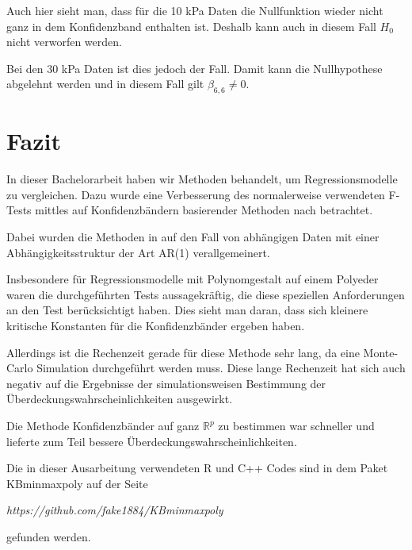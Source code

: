 \documentclass[12pt,a4paper]{article}
\theoremstyle{definition}
\theoremstyle{definition}
\theoremstyle{definition}
\theoremstyle{definition}
\begin{document}
Auch hier sieht man, dass für die 10 kPa Daten die Nullfunktion wieder nicht ganz in dem Konfidenzband enthalten ist. Deshalb kann auch in diesem Fall $H_0$ nicht verworfen werden.

Bei den 30 kPa Daten ist dies jedoch der Fall. Damit kann die Nullhypothese abgelehnt werden und in diesem Fall gilt $\beta_{6,6} \neq 0$.



\newpage
\section*{Fazit}
In dieser Bachelorarbeit haben wir Methoden behandelt, um Regressionsmodelle zu vergleichen. Dazu wurde eine Verbesserung des normalerweise verwendeten F-Tests mittles auf Konfidenzbändern basierender Methoden nach \cite{Liu64} betrachtet.

Dabei wurden die Methoden in \cite{Liu64} auf den Fall von abhängigen Daten mit einer Abhängigkeitsstruktur der Art AR(1) verallgemeinert.

Insbesondere für Regressionsmodelle mit Polynomgestalt auf einem Polyeder waren die durchgeführten Tests aussagekräftig, die diese speziellen Anforderungen an den Test berücksichtigt haben. Dies sieht man daran, dass sich kleinere kritische Konstanten für die Konfidenzbänder ergeben haben. 

Allerdings ist die Rechenzeit gerade für diese Methode sehr lang, da eine Monte-Carlo Simulation durchgeführt werden muss. Diese lange Rechenzeit hat sich auch negativ auf die Ergebnisse der simulationsweisen Bestimmung der Überdeckungswahrscheinlichkeiten ausgewirkt.

Die Methode Konfidenzbänder auf ganz $\mathbb{R}^p$ zu bestimmen war schneller und lieferte zum Teil bessere Überdeckungswahrscheinlichkeiten.

Die in dieser Ausarbeitung verwendeten R und C++ Codes sind in dem Paket KBminmaxpoly auf der Seite 

\begin{center}
\textit{https://github.com/fake1884/KBminmaxpoly} 
\end{center}

gefunden werden.





\nocite{Hsu41}

\newpage
\printbibliography


\newpage
\end{document}
